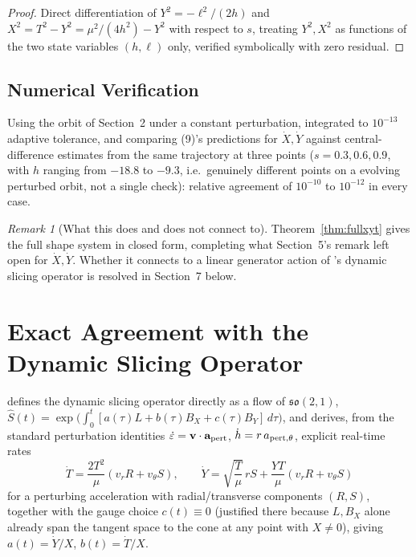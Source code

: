 \documentclass[12pt]{amsart}
\theoremstyle{plain}
\theoremstyle{remark}
\newtheorem*{remark}{Remark}
\begin{document}
\begin{proof}
Direct differentiation of $Y^2=-\ell^2/(2h)$ and $X^2=T^2-Y^2=\mu^2/(4h^2)-Y^2$ with respect to $s$, treating $Y^2,X^2$ as functions of the two state variables $(h,\ell)$ only, verified symbolically with zero residual.
\end{proof}

\subsection*{Numerical Verification}
Using the orbit of Section~2 under a constant perturbation, integrated to $10^{-13}$ adaptive tolerance, and comparing (9)'s predictions for $\dot X,\dot Y$ against central-difference estimates from the same trajectory at three points ($s=0.3,0.6,0.9$, with $h$ ranging from $-18.8$ to $-9.3$, i.e.\ genuinely different points on a evolving perturbed orbit, not a single check): relative agreement of $10^{-10}$ to $10^{-12}$ in every case.

\begin{remark}[What this does and does not connect to]
Theorem~\ref{thm:fullxyt} gives the full shape system in closed form, completing what Section~5's remark left open for $\dot X,\dot Y$. Whether it connects to a linear generator action of \cite{Ebert2026Cone}'s dynamic slicing operator is resolved in Section~7 below.
\end{remark}

\section{Exact Agreement with the Dynamic Slicing Operator}

\cite{Ebert2026Cone} defines the dynamic slicing operator directly as a flow of $\mathfrak{so}(2,1)$, $\hat S(t)=\exp\big(\int_0^t[a(\tau)L+b(\tau)B_X+c(\tau)B_Y]\,d\tau\big)$, and derives, from the standard perturbation identities $\dot\varepsilon=\mathbf v\cdot\mathbf a_{\rm pert}$, $\dot h=r\,a_{{\rm pert},\theta}$, explicit real-time rates
\begin{equation}
\dot T=\frac{2T^2}{\mu}(v_rR+v_\theta S), \qquad \dot Y=\sqrt{\frac T\mu}\,rS+\frac{YT}{\mu}(v_rR+v_\theta S) \tag{10}
\end{equation}
for a perturbing acceleration with radial/transverse components $(R,S)$, together with the gauge choice $c(t)\equiv0$ (justified there because $L,B_X$ alone already span the tangent space to the cone at any point with $X\ne0$), giving $a(t)=\dot Y/X$, $b(t)=\dot T/X$.
\end{document}

